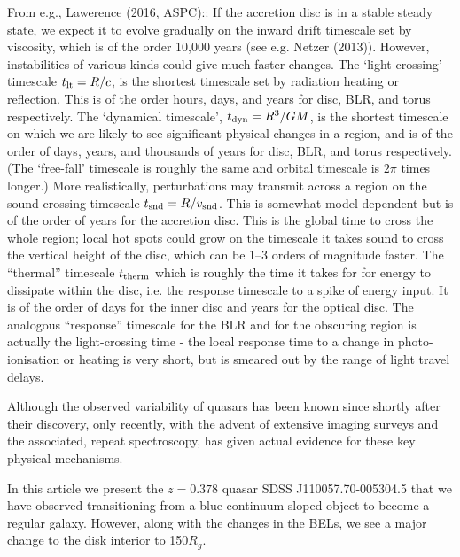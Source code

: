 \documentclass{nature}
\begin{document}
From e.g., Lawerence (2016, ASPC):: 
If the accretion disc is in a stable steady state, we expect it to
evolve gradually on the inward drift timescale set by viscosity, which
is of the order 10,000 years (see e.g. Netzer (2013)). However,
instabilities of various kinds could give much faster changes. The
`light crossing' timescale $t_{\rm lt} = R/c$, is the shortest
timescale set by radiation heating or reflection. This is of the order hours, days, and years for disc, BLR,
and torus respectively. The `dynamical timescale', $t_{\rm dyn} =
R^{3}/GM$, is the shortest timescale on which we are likely to see
significant physical changes in a region, and is of the order of days, years, and
thousands of years for disc, BLR, and torus respectively. (The
`free-fall' timescale is roughly the same and orbital timescale is
$2\pi$ times longer.) More realistically, perturbations may transmit
across a region on the sound crossing timescale $t_{\rm snd} =
R/v_{\rm snd}$. This is somewhat model dependent but is of the order
of years for the accretion disc. This is the global time to cross the
whole region; local hot spots could grow on the timescale it takes
sound to cross the vertical height of the disc, which can be 1–3
orders of magnitude faster. The ``thermal'' timescale $t_{\rm therm}$
which is roughly the time it takes for for energy to dissipate within
the disc, i.e. the response timescale to a spike of energy
input. It is of the order of days for the inner disc and years for the
optical disc. The analogous ``response'' timescale for the BLR and for
the obscuring region is actually the light-crossing time - the local
response time to a change in photo-ionisation or heating is very
short, but is smeared out by the range of light travel delays.

Although the observed variability of quasars has been known since shortly after their 
discovery, only recently, with the advent of extensive imaging surveys and the 
associated, repeat spectroscopy, has given actual evidence for these 
key physical mechanisms. 

In this article we present the $z=0.378$ quasar SDSS J110057.70-005304.5 
that we have observed transitioning from a blue continuum sloped object to 
become a regular galaxy. However, along with the changes in the BELs, we 
see a major change to the disk interior to 150$R_{g}$. 
 
\end{document}
